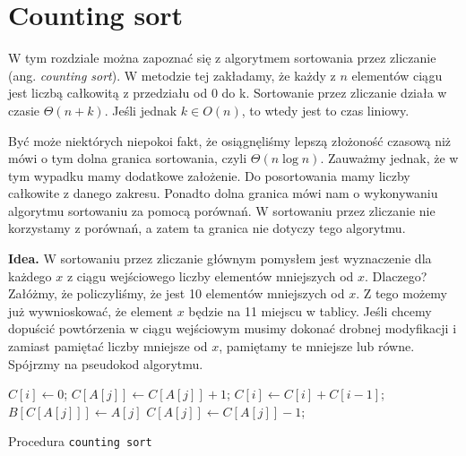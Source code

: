 \section{Counting sort}

\label{sec:countingsort}

W tym rozdziale można zapoznać się z algorytmem sortowania przez zliczanie (ang. \textit{counting sort}). 
W metodzie tej zakładamy, że każdy z $n$ elementów ciągu jest liczbą całkowitą z przedziału od 0 do k.
Sortowanie przez zliczanie działa w czasie $\Theta(n+k)$.
Jeśli jednak $k \in O(n)$, to wtedy jest to czas liniowy.

Być może niektórych niepokoi fakt, że osiągnęliśmy lepszą złożoność czasową niż mówi o tym dolna granica sortowania, czyli $\Theta(n \log n)$.
Zauważmy jednak, że w tym wypadku mamy dodatkowe założenie.
Do posortowania mamy liczby całkowite z danego zakresu.
Ponadto dolna granica mówi nam o wykonywaniu algorytmu sortowaniu za pomocą porównań.
W sortowaniu przez zliczanie nie korzystamy z porównań, a zatem ta granica nie dotyczy tego algorytmu.

\textbf{Idea.} W sortowaniu przez zliczanie głównym pomysłem jest wyznaczenie dla każdego $x$ z ciągu wejściowego liczby elementów mniejszych od $x$.
Dlaczego?
Załóżmy, że policzyliśmy, że jest 10 elementów mniejszych od $x$.
Z tego możemy już wywnioskować, że element $x$ będzie na 11 miejscu w tablicy.
Jeśli chcemy dopuścić powtórzenia w ciągu wejściowym musimy dokonać drobnej modyfikacji i zamiast pamiętać liczby mniejsze od $x$, pamiętamy te mniejsze lub równe.
Spójrzmy na pseudokod algorytmu.

\begin{algorithm}[h]

  \DontPrintSemicolon
  
  

  
     {
    $C[i] \leftarrow 0$;
  }
      {
    $C[A[j]] \leftarrow C[A[j]]+1$;
  }
      {
    $C[i] \leftarrow C[i]+C[i-1]$;
  }
      {
    $B[C[A[j]]] \leftarrow A[j]$\;
    $C[A[j]] \leftarrow C[A[j]]-1$;
  }
  
  \caption{Procedura \texttt{counting sort}}
  \label{alg-count}
\end{algorithm}

